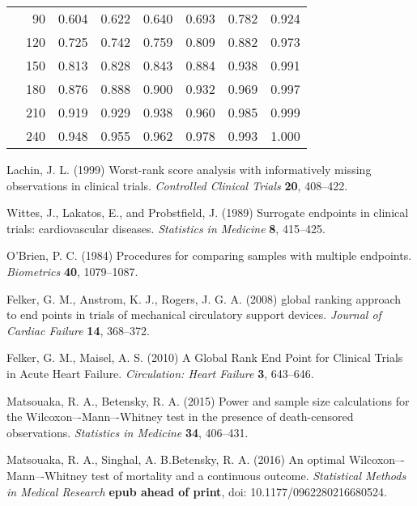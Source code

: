 \documentclass[bimj,fleqn]{w-art}\usepackage[]{graphicx}\usepackage[]{color}
\theoremstyle{plain}
\theoremstyle{definition}
\begin{document}
\begin{table}[ht]
\begin{tabular}{lrrrrrrr}
   & 90 & 0.604 & 0.622 & 0.640 & 0.693 & 0.782 & 0.924 \\ 
   & 120 & 0.725 & 0.742 & 0.759 & 0.809 & 0.882 & 0.973 \\ 
   & 150 & 0.813 & 0.828 & 0.843 & 0.884 & 0.938 & 0.991 \\ 
   & 180 & 0.876 & 0.888 & 0.900 & 0.932 & 0.969 & 0.997 \\ 
   & 210 & 0.919 & 0.929 & 0.938 & 0.960 & 0.985 & 0.999 \\ 
   & 240 & 0.948 & 0.955 & 0.962 & 0.978 & 0.993 & 1.000 \\ 
   \hline
\end{tabular}
\end{table}




\begin{thebibliography}{10}

 Lachin, J. L. (1999) Worst-rank score
analysis with informatively missing observations in clinical trials.
\textit{Controlled Clinical Trials} \textbf{20}, 408--422.

Wittes, J., Lakatos, E., and Probstfield, J. (1989) Surrogate endpoints in
clinical trials: cardiovascular diseases. \textit{Statistics in Medicine}
\textbf{8}, 415--425.

 O'Brien, P. C. (1984) Procedures
for comparing samples with multiple endpoints. \textit{Biometrics}
\textbf{40}, 1079--1087.

Felker, G. M., Anstrom, K. J., Rogers, J. G. A. (2008) global ranking approach
to end points in trials of mechanical circulatory support devices.
\textit{Journal of Cardiac Failure} \textbf{14}, 368--372.

 Felker, G. M.,
Maisel, A. S. (2010) A Global Rank End Point for Clinical Trials in Acute Heart
Failure. \textit{Circulation: Heart Failure} \textbf{3}, 643--646.

Matsouaka, R. A., Betensky, R. A. (2015) Power and sample size calculations for
the Wilcoxon–-Mann–-Whitney test in the presence of death-censored observations.
\textit{Statistics in Medicine} \textbf{34}, 406--431.

Matsouaka, R. A., Singhal, A. B.Betensky, R. A. (2016) An optimal
Wilcoxon–-Mann–-Whitney test of mortality and a continuous outcome.
\textit{Statistical Methods in Medical Research}
\textbf{epub ahead of print},  doi: 10.1177/0962280216680524.


\end{thebibliography}
\end{document}
